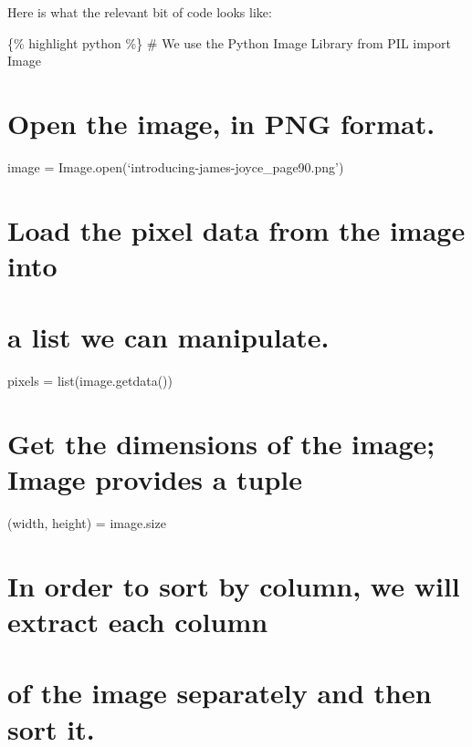 \documentclass[
  12pt,
]{article}
\begin{document}
Here is what the relevant bit of code looks like:

\{\% highlight python \%\} \# We use the Python Image Library from PIL
import Image

\hypertarget{open-the-image-in-png-format.}{%
\section{Open the image, in PNG
format.}\label{open-the-image-in-png-format.}}

image = Image.open(`introducing-james-joyce\_page90.png')

\hypertarget{load-the-pixel-data-from-the-image-into}{%
\section{Load the pixel data from the image
into}\label{load-the-pixel-data-from-the-image-into}}

\hypertarget{a-list-we-can-manipulate.}{%
\section{a list we can manipulate.}\label{a-list-we-can-manipulate.}}

pixels = list(image.getdata())

\hypertarget{get-the-dimensions-of-the-image-image-provides-a-tuple}{%
\section{Get the dimensions of the image; Image provides a
tuple}\label{get-the-dimensions-of-the-image-image-provides-a-tuple}}

(width, height) = image.size

\hypertarget{in-order-to-sort-by-column-we-will-extract-each-column}{%
\section{In order to sort by column, we will extract each
column}\label{in-order-to-sort-by-column-we-will-extract-each-column}}

\hypertarget{of-the-image-separately-and-then-sort-it.}{%
\section{of the image separately and then sort
it.}\label{of-the-image-separately-and-then-sort-it.}}
\end{document}
